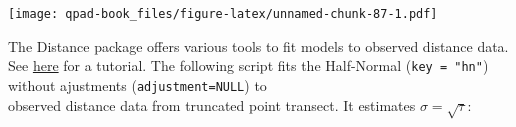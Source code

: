 \documentclass[12pt,]{book}
\newenvironment{Shaded}{\begin{snugshade}}{\end{snugshade}}
\newcommand{\DataTypeTok}[1]{\textcolor[rgb]{0.13,0.29,0.53}{#1}}
\newcommand{\DecValTok}[1]{\textcolor[rgb]{0.00,0.00,0.81}{#1}}
\newcommand{\KeywordTok}[1]{\textcolor[rgb]{0.13,0.29,0.53}{\textbf{#1}}}
\newcommand{\NormalTok}[1]{#1}
\newcommand{\OperatorTok}[1]{\textcolor[rgb]{0.81,0.36,0.00}{\textbf{#1}}}
\newcommand{\OtherTok}[1]{\textcolor[rgb]{0.56,0.35,0.01}{#1}}
\newcommand{\StringTok}[1]{\textcolor[rgb]{0.31,0.60,0.02}{#1}}
\begin{document}
\begin{Shaded}
\end{Shaded}

\texttt{[image: qpad-book\_files/figure-latex/unnamed-chunk-87-1.pdf]}

The Distance package offers various tools to fit
models to observed distance data.
See \href{https://workshops.distancesampling.org/duke-spatial-2015/practicals/1-detection-functions-solutions.html}{here} for a tutorial.
The following script fits the Half-Normal (\texttt{key\ =\ "hn"})
without ajustments (\texttt{adjustment=NULL}) to\\
observed distance data from truncated point transect.
It estimates \(\sigma = \sqrt{\tau}\):
\end{document}
